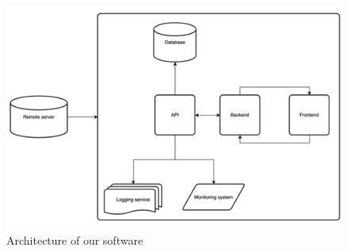 \documentclass{article}
\begin{document}
\begin{figure}[H]
    \centering
     \includegraphics[width=\textwidth]{images/Software_architecture.png}
    \caption{Architecture of our software}
    \label{fig:architecture}
\end{figure}
\end{document}
